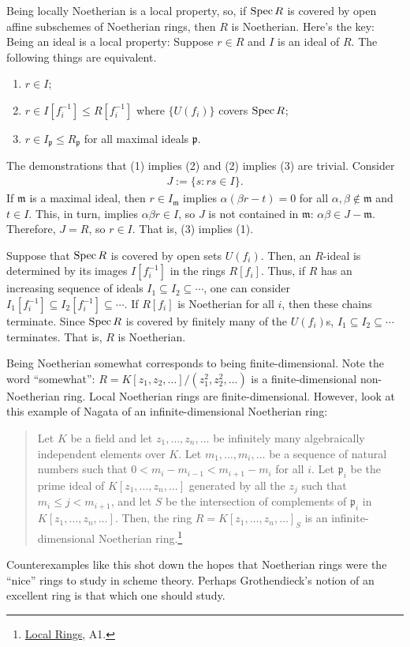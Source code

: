 \documentclass [11 pt, oneside] {article}
\begin{document}
\begin{remark}
	Being locally Noetherian is a local property, so, if $\operatorname{Spec} R$ is covered by open affine subschemes of Noetherian rings, then $R$ is Noetherian. Here's the key: Being an ideal is a local property: Suppose $r\in R$ and $I$ is an ideal of $R$. The following things are equivalent.
	\begin{enumerate}
		\item $r\in I$;
		\item $r\in I[f_i^{-1}]\le R[f_i^{-1}]$ where $\{U({f_i})\}$ covers $\operatorname{Spec} R$;
		\item $r\in I_{\mathfrak{p}}\le R_{\mathfrak{p}}$ for all maximal ideals $\mathfrak{p}$.
	\end{enumerate}
	The demonstrations that (1) implies (2) and (2) implies (3) are trivial. Consider
	\begin{align*}
		J := \{ s : rs \in I\}.
	\end{align*}
	If $\mathfrak{m}$ is a maximal ideal, then $r\in I_{\mathfrak{m}}$ implies $\alpha(\beta r - t) =0$ for all $\alpha,\beta\notin \mathfrak{m}$ and $t\in I$. This, in turn, implies $\alpha\beta r\in I$, so $J$ is not contained in $\mathfrak{m}$: $\alpha\beta\in J-\mathfrak{m}$. Therefore, $J=R$, so $r\in I$. That is, (3) implies (1).

Suppose that $\operatorname{Spec} R$ is covered by open sets $U({f_i})$. Then, an $R$-ideal is determined by its images $I[f_i^{-1}]$ in the rings $R[f_i]$. Thus, if $R$ has an increasing sequence of ideals $I_1\subseteq I_2\subseteq \cdots$, one can consider $I_1[f_i^{-1}]\subseteq I_2[f_i^{-1}]\subseteq\cdots$. If $R[f_i]$ is Noetherian for all $i$, then these chains terminate. Since $\operatorname{Spec} R$ is covered by finitely many of the $U({f_i})$s, $I_1\subseteq I_2\subseteq \cdots$ terminates. That is, $R$ is Noetherian.  
\end{remark}

\begin{remark}
	Being Noetherian somewhat corresponds to being finite-dimensional. Note the word ``somewhat'': $R = K[z_1,z_2,\hdots]/(z_1^2,z_2^2,\hdots)$ is a finite-dimensional non-Noetherian ring. Local Noetherian rings are finite-dimensional. However, look at this example of Nagata of an infinite-dimensional Noetherian ring:
\begin{quote}
\small
Let $K$ be a field and let $z_1,\hdots, z_n,\hdots$ be infinitely many algebraically independent elements over $K$. Let $m_1,\hdots, m_i,\hdots$ be a sequence of natural numbers such that $0<m_i-m_{i-1} < m_{i+1}-m_i$ for all $i$. Let $\mathfrak{p}_i$ be the prime ideal of $K[z_1,\hdots, z_n,\hdots]$ generated by all the $z_j$ such that $m_i\le j<m_{i+1}$, and let $S$ be the intersection of complements of $\mathfrak{p}_i$ in $K[z_1,\hdots, z_n,\hdots]$. Then, the ring $R = K[z_1,\hdots, z_n,\hdots]_S$ is an infinite-dimensional Noetherian ring.\footnote{\ul{Local Rings}, A1.}
\end{quote}

	Counterexamples like this shot down the hopes that Noetherian rings were the ``nice'' rings to study in scheme theory. Perhaps Grothendieck's notion of an excellent ring is that which one should study.
\end{remark}
\end{document}
